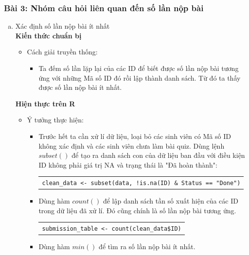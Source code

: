 \documentclass[a4paper]{article}
\theoremstyle{definition}
\begin{document}
\subsubsection*{Bài 3: Nhóm câu hỏi liên quan đến số lần nộp bài}
\begin{enumerate}[a)]
    \bf\item {Xác định số lần nộp bài ít nhất}\\[6pt]
    \bf Kiến thức chuẩn bị\normalfont
    \begin{itemize}
        \item Cách giải truyền thống:
        \begin{itemize}
            \item Ta đếm số lần lặp lại của các ID để biết được số lần nộp bài tương ứng với những Mã số ID đó rồi lập thành danh sách. Từ đó ta thấy được số lần nộp bài ít nhất.
        \end{itemize}
    \end{itemize}
    \bf Hiện thực trên R\normalfont
    \begin{itemize}
        \item Ý tưởng thực hiện:
        \begin{itemize}
            \item Trước hết ta cần xử lí dữ liệu, loại bỏ các sinh viên có Mã số ID không xác định và các sinh viên chưa làm bài quiz. Dùng lệnh $subset()$ để tạo ra danh sách con của dữ liệu ban đầu với điều kiện ID không phải giá trị NA và trạng thái là "Đã hoàn thành":
            \begin{center}
                \begin{tabular}{p{13cm}}
                    \texttt{clean\_data <- subset(data, !is.na(ID) \& Status == "Done")}
                \end{tabular}
            \end{center}
            \item Dùng hàm $count()$ để lập danh sách tần số xuất hiện của các ID trong dữ liệu đã xử lí. Đó cũng chính là số lần nộp bài tương ứng.
            \begin{center}
                \begin{tabular}{p{13cm}}
                    \texttt{submission\_table <- count(clean\_data\$ID)}
                \end{tabular}
            \end{center}
            \item Dùng hàm $min()$ để tìm ra số lần nộp bài ít nhất.
            \begin{center}

\end{center}
\end{itemize}
\end{itemize}
\end{enumerate}
\end{document}
